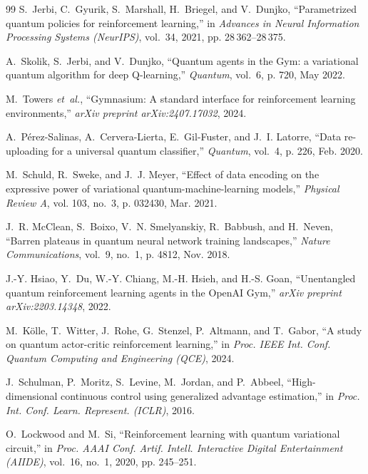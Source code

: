 \documentclass[conference]{IEEEtran}
\begin{document}
\begin{thebibliography}{99}
S.~Jerbi, C.~Gyurik, S.~Marshall, H.~Briegel, and V.~Dunjko, ``Parametrized quantum policies for reinforcement learning,'' in \emph{Advances in Neural Information Processing Systems (NeurIPS)}, vol.~34, 2021, pp. 28\,362--28\,375.

A.~Skolik, S.~Jerbi, and V.~Dunjko, ``Quantum agents in the {Gym}: a variational quantum algorithm for deep {Q}-learning,'' \emph{Quantum}, vol.~6, p. 720, May 2022.

M.~Towers \emph{et~al.}, ``{Gymnasium}: A standard interface for reinforcement learning environments,'' \emph{arXiv preprint arXiv:2407.17032}, 2024.

A.~P{\'e}rez-Salinas, A.~Cervera-Lierta, E.~Gil-Fuster, and J.~I. Latorre, ``Data re-uploading for a universal quantum classifier,'' \emph{Quantum}, vol.~4, p. 226, Feb. 2020.

M.~Schuld, R.~Sweke, and J.~J. Meyer, ``Effect of data encoding on the expressive power of variational quantum-machine-learning models,'' \emph{Physical Review A}, vol. 103, no.~3, p. 032430, Mar. 2021.

J.~R. McClean, S.~Boixo, V.~N. Smelyanskiy, R.~Babbush, and H.~Neven, ``Barren plateaus in quantum neural network training landscapes,'' \emph{Nature Communications}, vol.~9, no.~1, p. 4812, Nov. 2018.

J.-Y. Hsiao, Y.~Du, W.-Y. Chiang, M.-H. Hsieh, and H.-S. Goan, ``Unentangled quantum reinforcement learning agents in the {OpenAI Gym},'' \emph{arXiv preprint arXiv:2203.14348}, 2022.

M.~K{\"o}lle, T.~Witter, J.~Rohe, G.~Stenzel, P.~Altmann, and T.~Gabor, ``A study on quantum actor-critic reinforcement learning,'' in \emph{Proc. IEEE Int. Conf. Quantum Computing and Engineering (QCE)}, 2024.

J.~Schulman, P.~Moritz, S.~Levine, M.~Jordan, and P.~Abbeel, ``High-dimensional continuous control using generalized advantage estimation,'' in \emph{Proc. Int. Conf. Learn. Represent. (ICLR)}, 2016.

O.~Lockwood and M.~Si, ``Reinforcement learning with quantum variational circuit,'' in \emph{Proc. AAAI Conf. Artif. Intell. Interactive Digital Entertainment (AIIDE)}, vol.~16, no.~1, 2020, pp. 245--251.

\end{thebibliography}
\end{document}
